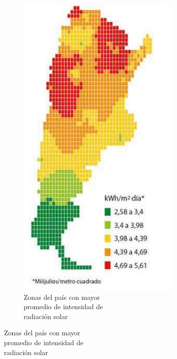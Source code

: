 \begin{figure}[H]
\centering
\begin{subfigure}{0.4\textwidth}
\includegraphics[width=1\linewidth]{Intro/Screenshot_1.png} 
\caption{Zonas del país con mayor \\promedio de intensidad de \\radiación solar}

\end{subfigure}
\end{figure}
